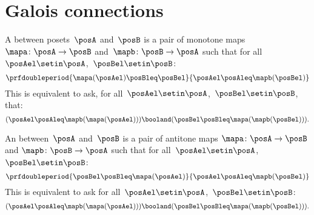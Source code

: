 

\section{Galois connections}\label{subsec:galois-connections}

\begin{ctdefinition}
    A \emph{} between posets~$\posA$ and~$\posB$ is a pair of monotone maps~$\mapa\colon \posA\to \posB$ and~$\mapb\colon \posB\to \posA$ such that for all~$\posAel\setin \posA$,~$\posBel\setin \posB$:
    \begin{equation}
        \prfdoubleperiod{\mapa(\posAel) \posBleq \posBel}{\posAel \posAleq \mapb(\posBel)}
    \end{equation}
    This is equivalent to ask, for all~$\posAel\setin \posA$,~$\posBel\setin \posB$, that:
    \begin{equation}
        (\posAel\posAleq \mapb(\mapa(\posAel)))
        \booland (\posBel\posBleq \mapa(\mapb(\posBel))).
    \end{equation}
\end{ctdefinition}

\begin{ctdefinition}
    An \emph{} between~$\posA$ and~$\posB$ is a pair of antitone maps $\mapa\colon \posA\to \posB$ and $\mapb \colon \posB\to \posA$ such that for all~$\posAel\setin \posA$, $\posBel\setin \posB$:
    \begin{equation}
        \prfdoubleperiod{\posBel \posBleq \mapa(\posAel)}{\posAel \posAleq \mapb(\posBel)}
    \end{equation}
    This is equivalent to ask for all~$\posAel\setin \posA$,~$\posBel\setin \posB$:
    \begin{equation}
        (\posAel \posAleq \mapb(\mapa(\posAel)))
        \booland  (\posBel \posBleq \mapa(\mapb(\posBel))).
    \end{equation}
\end{ctdefinition}

